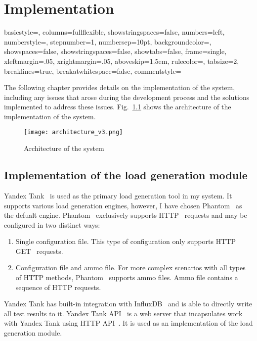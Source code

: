 \chapter{Implementation}
\label{ch:impl}


\newcommand{\code}[1]{\colorbox{light-gray}{\texttt{#1}}}

 {
    basicstyle=\small,
    columns=fullflexible,
    showstringspaces=false,
    numbers=left,
    numberstyle=\color{gray}\small,
    stepnumber=1,
    numbersep=10pt,
    backgroundcolor=\color{white},
    showspaces=false,
    showstringspaces=false,
    showtabs=false,
    frame=single,
    xleftmargin=.05\textwidth,
    xrightmargin=.05\textwidth,
    aboveskip=1.5em,
    rulecolor=\color{black},
    tabsize=2,
    breaklines=true,
    breakatwhitespace=false,
    commentstyle=\color{gray}\upshape
}

\lstset{style=CodeStyle}


The following chapter provides details on the implementation of the system, including any issues that arose during the development process and the solutions implemented to address these issues.
Fig.~\ref{fig:architecture} shows the architecture of the implementation of the system.

\begin{figure}[t]
    \centering
    \texttt{[image: architecture\_v3.png]}
    \caption{Architecture of the system}
    \label{fig:architecture}
\end{figure}

\section{Implementation of the load generation module}\label{sec:yandex_tank_use}
Yandex Tank~\cite{yandex_tank} is used as the primary load generation tool in my system. It supports various load generation engines, however, I have chosen Phantom~\cite{phantom} as the defualt engine. Phantom~\cite{phantom} exclusively supports HTTP~\cite{http} requests and may be configured in two distinct ways:
\begin{enumerate}
    \item Single configuration file. This type of configuration only supports HTTP GET~\cite{http} requests.
    \item Configuration file and ammo file. For more complex scenarios with all types of HTTP methods, Phantom~\cite{phantom} supports ammo files. Ammo file contains a sequence of HTTP requests.
\end{enumerate}
Yandex Tank has built-in integration with InfluxDB~\cite{influxdb} and is able to directly write all test results to it.
Yandex Tank API~\cite{yandex_tank_api} is a web server that incapsulates work with Yandex Tank using HTTP API~\cite{microservices}. It is used as an implementation of the load generation module.


